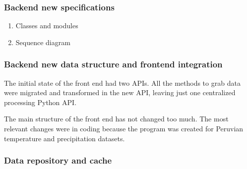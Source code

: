 \documentclass[a4paper]{article}
\begin{document}
\large
\begin{center}

\end{center}
\normalsize

\subsubsection{Backend new specifications}
\label{sec:org3b006ae}

\begin{enumerate}
\item Classes and modules
\label{sec:org8075eb5}

\begin{center}

\end{center}

\item Sequence diagram
\label{sec:orgfce1023}

\small
\begin{center}

\end{center}
\normalsize
\end{enumerate}

\subsubsection{Backend new data structure and frontend integration}
\label{sec:orgee30619}

The initial state of the front end had two APIs. All the methods to grab data were migrated and transformed in the new API, leaving just one centralized processing Python API.

The main structure of the front end has not changed too much. The most relevant changes were in coding because the program was created for Peruvian temperature and precipitation datasets.

\begin{center}

\end{center}

\subsubsection{Data repository and cache}
\label{sec:org8c8854d}
\end{document}
